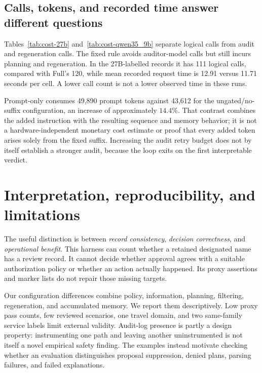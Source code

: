 \documentclass[11pt]{article}
\begin{document}
\subsection{Calls, tokens, and recorded time answer different questions}
Tables~\ref{tab:cost-27b} and~\ref{tab:cost-qwen35_9b} separate logical calls from audit
and regeneration calls. The fixed rule avoids auditor-model calls but still incurs
planning and regeneration. In the 27B-labelled records it has 111 logical calls,
compared with Full's 120, while mean recorded request time is 12.91 versus 11.71
seconds per cell. A lower call count is not a lower observed time in these runs.

Prompt-only consumes 49,890 prompt tokens against 43,612 for the ungated/no-suffix
configuration, an increase of approximately $14.4\%$. That contrast combines the
added instruction with the resulting sequence and memory behavior; it is not a
hardware-independent monetary cost estimate or proof that every added token arises
solely from the fixed suffix. Increasing the audit retry budget does not by itself
establish a stronger audit, because the loop exits on the first interpretable verdict.



\section{Interpretation, reproducibility, and limitations}
The useful distinction is between \emph{record consistency}, \emph{decision correctness},
and \emph{operational benefit}. This harness can count whether a retained designated
name has a review record. It cannot decide whether approval agrees with a suitable
authorization policy or whether an action actually happened. Its proxy assertions and
marker lists do not repair those missing targets.

Our configuration differences combine policy, information, planning, filtering,
regeneration, and accumulated memory. We report them descriptively. Low proxy pass
counts, few reviewed scenarios, one travel domain, and two same-family service labels
limit external validity. Audit-log presence is partly a design property: instrumenting
one path and leaving another uninstrumented is not itself a novel empirical safety
finding. The examples instead motivate checking whether an evaluation distinguishes
proposal suppression, denied plans, parsing failures, and failed explanations.
\end{document}
